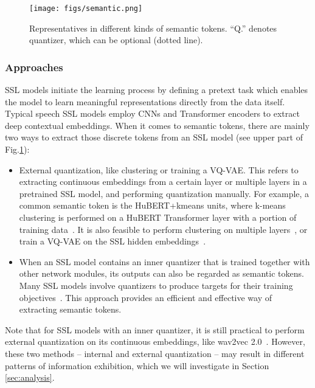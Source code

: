 \begin{figure}
    \centering
    \texttt{[image: figs/semantic.png]}
    \caption{Representatives in different kinds of semantic tokens. 
    ``Q.'' denotes quantizer, which can be optional (dotted line).}
    \vspace{-0.1in}
    \label{fig:semantic-types}
\end{figure}
\subsubsection{Approaches}

SSL models initiate the learning process by defining a pretext task which enables the model to learn meaningful representations directly from the data itself. 
Typical speech SSL models employ CNNs and Transformer encoders to extract deep contextual embeddings.
When it comes to semantic tokens, there are mainly two ways to extract those discrete tokens from an SSL model (see upper part of Fig.\ref{fig:semantic-types}):
\begin{itemize}[leftmargin=5mm]
    \item External quantization, like clustering or training a VQ-VAE. This refers to extracting continuous embeddings from a certain layer or multiple layers in a pretrained SSL model, and performing quantization manually.
    For example, a common semantic token is the HuBERT+kmeans units, where k-means clustering is performed on a HuBERT Transformer layer with a portion of training data~\cite{lakhotia2021generative,kharitonov-etal-2022-text}.
    It is also feasible to perform clustering on multiple layers~\cite{shi24h_interspeech,mousavi2024should}, or train a VQ-VAE on the SSL hidden embeddings~\cite{huang2023repcodec,wang2024maskgct}.
    \item When an SSL model contains an inner quantizer that is trained together with other network modules, its outputs can also be regarded as semantic tokens.
    Many SSL models involve quantizers to produce targets for their training objectives~\cite{vq-wav2vec,baevski2020wav2vec,chiu2022self,zhu2025muq}.
    This approach provides an efficient and effective way of extracting semantic tokens.
\end{itemize}
Note that for SSL models with an inner quantizer, it is still practical to perform external quantization on its continuous embeddings, like wav2vec 2.0~\cite{baevski2020wav2vec}.
However, these two methods -- internal and external quantization -- may result in different patterns of information exhibition, which we will investigate in Section \ref{sec:analysis}.

